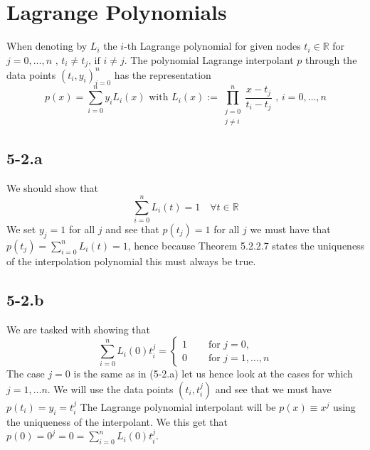 \documentclass{article}
\begin{document}
\section{Lagrange Polynomials}
When denoting by $L_{i}$ the $i$-th Lagrange polynomial for given nodes $t_{i}\in \mathbb{R}$ for $j = 0, \dots, n \text{ , } t_{i}\neq t_{j} \text{, if } i \neq j$. The polynomial Lagrange interpolant $p$ through the data points $\left(t_{i},y_{i}\right)_{i=0}^{n}$ has the representation
\begin{equation*}
    p\left(x\right) = \sum_{i=0}^{n}y_{i}L_{i}\left(x\right) \text{ with } L_{i}\left(x\right) := \prod_{\substack{j = 0 \\ j\neq i}}^{n}\frac{x-t_{j}}{t_{i}-t_{j}}\text{ , } i = 0,\dots,n
\end{equation*}
\subsection*{5-2.a} We should show that
\begin{equation*}
    \sum_{i=0}^{n}L_{i}\left(t\right) = 1 \quad \forall t  \in \mathbb{R}
\end{equation*}
We set $y_{j} = 1$ for all $j$ and see that $p\left(t_{j}\right) = 1$ for all $j$ we must have that $p\left(t_{j}\right) = \sum_{i=0}^{n}L_{i}\left(t\right) = 1$, hence because Theorem 5.2.2.7 states the uniqueness of the interpolation polynomial this must always be true.
\subsection*{5-2.b} We are tasked with showing that 
\begin{equation*}
    \sum_{i=0}^{n}L_{i}\left(0\right)t_{i}^{j} = \begin{cases}
        1 \quad &\text{ for } j = 0 \text{,} \\
        0 \quad &\text{ for } j = 1, \dots , n
    \end{cases}
\end{equation*}
The case $j=0$ is the same as in (5-2.a) let us hence look at the cases for which $j = 1, \dots n$. We will use the data points $\left(t_{i},t_{i}^{j}\right)$ and see that we must have $p\left(t_{i}\right) = y_{i} = t_{i}^{j}$ The Lagrange polynomial interpolant will be $p\left(x\right) \equiv x^{j}$ using the uniqueness of the interpolant. We this get that $p\left(0\right) = 0^{j} = 0 = \sum_{i = 0}^{n}L_{i}\left(0\right)t_{i}^{j}$.
\end{document}
